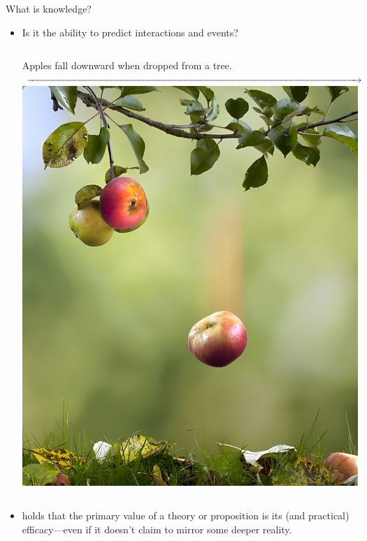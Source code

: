 \begin{frame}{What is knowledge?}
    \begin{itemize}
        \item
              Is it the ability to predict interactions and events?
              \vspace{1em}
              \begin{center}
                  \begin{minipage}{0.7\textwidth}
                      \begin{columns}[c]
                          \centering
                          Apples fall downward when dropped from a tree.
                          \centering
                          $\xrightarrow{\rule{\linewidth}{0pt}}$
                          \centering
                          \includegraphics[width=\linewidth]{images/apple-falling.png}
                      \end{columns}
                  \end{minipage}
              \end{center}
        \item {} holds that the primary value of a theory or proposition is its  (and practical) efficacy—even if it doesn't claim to mirror some deeper reality.
    \end{itemize}
\end{frame}

